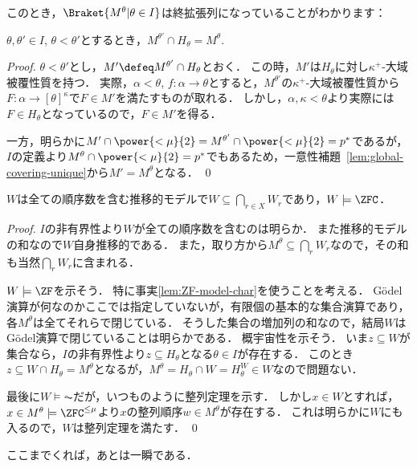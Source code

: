 \documentclass[a4j,leqno]{ltjsarticle}
\begin{document}
このとき，$\Braket{M^\theta | \theta \in I}$は終拡張列になっていることがわかります：
\begin{lemma}
 $\theta, \theta' \in I$, $\theta < \theta'$とするとき，$M^{\theta'} \cap H_\theta = M^\theta$.
\end{lemma}
\begin{proof}
 $\theta < \theta'$とし，$M' \defeq M^{\theta'} \cap H_\theta$とおく．
 この時，$M'$は$H_\theta$に対し$\kappa^+$-大域被覆性質を持つ．
 実際，$\alpha < \theta$, $f: \alpha \to \theta$とすると，$M^{\theta'}$の$\kappa^+$-大域被覆性質から$F: \alpha \to [\theta]^{\kappa}$で$F \in M'$を満たすものが取れる．
 しかし，$\alpha, \kappa < \theta$より実際には$F \in H_\theta$となっているので，$F \in M'$を得る．

 一方，明らかに$M' \cap \power{<\mu}{2} = M^{\theta'} \cap \power{<\mu}{2} = p^*$であるが，$I$の定義より$M^\theta \cap \power{<\mu}{2} = p^*$でもあるため，一意性補題~\ref{lem:global-covering-unique}から$M' = M^\theta$となる． \qed
\end{proof}

\begin{lemma}
 $W$は全ての順序数を含む推移的モデルで$W \subseteq \bigcap_{r \in X} W_r$であり，$W \models \ZFC$．
\end{lemma}
\begin{proof}
 $I$の非有界性より$W$が全ての順序数を含むのは明らか．
 また推移的モデルの和なので$W$自身推移的である．
 また，取り方から$M^\theta \subseteq \bigcap_r W_r$なので，その和も当然$\bigcap_r W_r$に含まれる．

 $W \models \ZF$を示そう．
 特に事実\ref{lem:ZF-model-char}を使うことを考える．
 G\"{o}del演算が何なのかここでは指定していないが，有限個の基本的な集合演算であり，各$M^\theta$は全てそれらで閉じている．
 そうした集合の増加列の和なので，結局$W$はG\"{o}del演算で閉じていることは明らかである．
 概宇宙性を示そう．
 いま$z \subseteq W$が集合なら，$I$の非有界性より$z \subseteq H_\theta$となる$\theta \in I$が存在する．
 このとき$z \subseteq W \cap H_\theta = M^\theta$となるが，$M^\theta = H_\theta \cap W = H_\theta^W \in W$なので問題ない．

 最後に$W \models \AC$だが，いつものように整列定理を示す．
 しかし$x \in W$とすれば，$x \in M^\theta \models \ZFC^{\leq\mu}$より$x$の整列順序$w \in M^\theta$が存在する．
 これは明らかに$W$にも入るので，$W$は整列定理を満たす． \qed
\end{proof}

ここまでくれば，あとは一瞬である．
\end{document}
